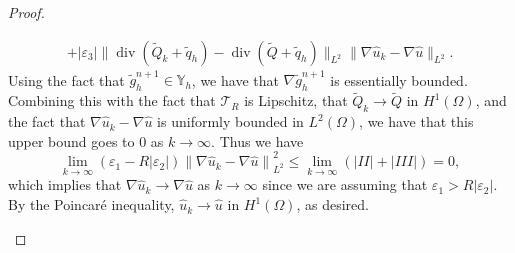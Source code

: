 \documentclass[10pt,letterpaper]{amsart}
\newcommand\norm[1]{\left\lVert#1\right\rVert}
\newcommand{\Grad}{\nabla}
\newcommand{\T}{\mathcal T}
\theoremstyle{definition}{\newtheorem{definition}[lemma]{Definition}}
\theoremstyle{note}{\newtheorem{claim}{Claim}[section]
\newtheorem*{claim*}{Claim}}
\numberwithin{equation}{section}
\begin{document}
\begin{proof}
\begin{itemize}
\begin{multline*}
      + \lvert\varepsilon_3\rvert\|\operatorname{div}(\tilde Q_k + \tilde q_h) - \operatorname{div}(\tilde Q + \tilde q_h)\|_{L^2}\|\nabla\widehat{u}_k - \nabla \widehat{u}\|_{L^2}.
    \end{multline*}
    Using the fact that $\tilde g_h^{n+1}\in\mathbb{Y}_h$, we have that $\nabla\tilde g_h^{n+1}$ is essentially bounded. Combining this with the fact that $\T_R$ is Lipschitz, that $\tilde Q_k\to \tilde Q$ in $H^1(\Omega)$, and the fact that $\nabla\widehat{u}_k-\nabla\widehat{u}$ is uniformly bounded in $L^2(\Omega)$, we have that this upper bound goes to $0$ as $k\to\infty$.
    Thus we have
    \begin{equation*}
    \lim_{k\to \infty} (\varepsilon_1-R|\varepsilon_2|)\norm{\Grad \widehat{u}_k-\Grad\widehat{u}}_{L^2}^2\leq \lim_{k\to \infty} (|II|+|III|) = 0,
    \end{equation*}
    which implies that $\Grad\widehat{u}_k\to \Grad \widehat{u}$ as $k\to\infty$ since we are assuming that $\varepsilon_1>R|\varepsilon_2|$. 
By the Poincar\'e inequality, $\widehat{u}_k\to \widehat{u}$ in $H^1(\Omega)$, as desired.
    

\end{itemize}
\end{proof}
\end{document}
